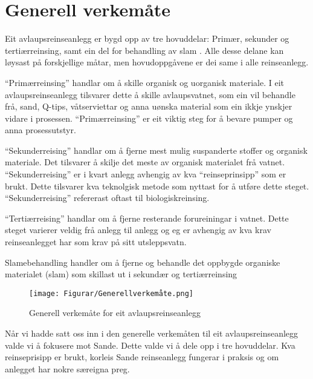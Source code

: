 \section{Generell verkemåte}

Eit avlaupsreinseanlegg er bygd opp av tre hovuddelar: Primær, sekunder og tertiærreinsing,
samt ein del for behandling av slam \citep{Regjeriga}.
Alle desse delane kan løysast på forskjellige måtar, men hovudoppgåvene er dei same
i alle reinseanlegg.

``Primærreinsing'' handlar om å skille organisk og uorganisk materiale.
I eit avlaupsreinseanlegg tilsvarer dette å skille avlaupsvatnet, 
som ein vil behandle frå, sand, Q-tips, våtserviettar
og anna uønska material som ein ikkje ynskjer vidare i prosessen.\newline
``Primærreinsing'' er eit viktig steg for å bevare pumper og anna prosessutstyr.

``Sekunderreising'' handlar om å fjerne mest mulig suspanderte stoffer og organisk materiale.
Det tilsvarer å skilje det meste av organisk materialet frå vatnet.
``Sekunderreising'' er i kvart anlegg avhengig av kva ``reinseprinsipp'' som er brukt. Dette tilsvarer
kva teknolgisk metode som nyttast for å utføre dette steget.
``Sekunderreising'' refererast oftast til biologiskreinsing.

``Tertiærreising'' handlar om å fjerne resterande forureiningar i vatnet.
Dette steget varierer veldig frå anlegg til anlegg og eg er
avhengig av kva krav reinseanlegget har som krav på sitt utsleppsvatn.

Slamebehandling handler om å fjerne og behandle det oppbygde organiske materialet (slam)
som skillast ut i sekundær og tertiærreinsing 

\begin{figure}[htbp]
    \centering
    \texttt{[image: Figurar/Generellverkemåte.png]}
    \caption{Generell verkemåte for eit avlaupsreinseanlegg}\label{fig:GenerellVerkemåte}
\end{figure}

Når vi hadde satt oss inn i den generelle verkemåten til eit avlaupsreinseanlegg
valde vi å fokusere mot Sande.
Dette valde vi å dele opp i tre hovuddelar. Kva reinseprisipp er brukt, korleis Sande reinseanlegg
fungerar i praksis og om anlegget har nokre særeigna preg.
